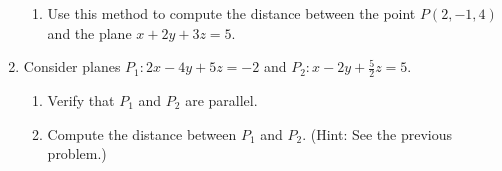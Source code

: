 \documentclass[12pt]{article}
\newif\ifans
\begin{document}
\begin{enumerate}
\begin{enumerate}
\item Use this method to compute the distance between the point $P(2,-1,4)$ and the plane $x+2y+3z=5$.

\ifans{\fbox{$d=\frac{7}{\sqrt{14}}$}} \fi

\end{enumerate}

\item Consider planes $P_1:2x-4y+5z=-2$ and $P_2:x-2y+\frac{5}{2}z=5$.

\begin{enumerate}

\item Verify that $P_1$ and $P_2$ are parallel.

\ifans{\fbox{\parbox{1\linewidth}{${\bf n_1}=\langle 2, -4, 5\rangle$ is normal to plane $P_1$.\\
${\bf n_2}=\left\langle 1, -2, \frac{5}{2}\right\rangle$ is normal to plane $P_2$.\\
Since ${\bf n_1}=2{\bf n_2}$, we have that ${\bf n_1}$ and ${\bf n_2}$ are parallel.  And, because these normal vectors are parallel, the planes $P_1$ and $P_2$ are parallel, too.}}} \fi

\item Compute the distance between $P_1$ and $P_2$.  (Hint: See the previous problem.)

\ifans{\fbox{$d=\frac{12}{\sqrt{45}}$}} \fi

\end{enumerate}

\end{enumerate}
\end{document}
